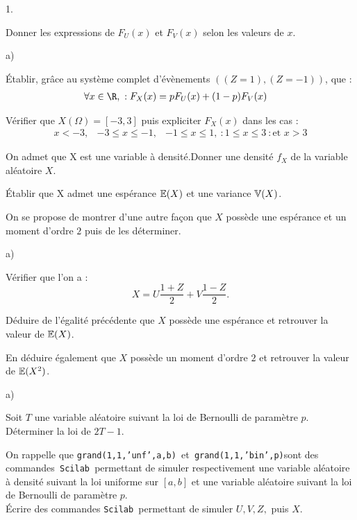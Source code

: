 \documentclass[11pt]{article}%
\begin{document}
\begin{noliste}{1.}
 \setlength{\itemsep}{4mm}
\item Donner les expressions de $F_{U}(x)$ et $F_{V}(x)$ selon les
valeurs
de $x$. 
\item 

\begin{noliste}{a)}
 \setlength{\itemsep}{2mm}
\item Établir, grâce au système complet d'évènements $\left((Z = 1),(Z
= -1)\right)$, que : 
\begin{align*}
\forall x\in\R,\ :F_{X}(x) & = pF_{U}(x) + (1-p)F_{V}(x)
\end{align*}

\item Vérifier que $X(\varOmega) = [-3,3]$ puis expliciter $F_{X}(x)$
dans
les cas : 
\begin{eqnarray*}
x<-3, & -3\leq x\leq-1, & -1\leq x\leq1,\ :1\leq x\leq3\ :\mbox{et }x>3
\end{eqnarray*}

\item On admet que X est une variable à densité.Donner une densité
$f_{X}$
de la variable aléatoire $X$. 
\item \noindent Établir que X admet une espérance $\mathbb{E}(X)$ et une
variance
$\mathbb{V}(X)$. 
\end{noliste}
\item On se propose de montrer d'une autre façon que $X$ possède une
espérance
et un moment d'ordre $2$ puis de les déterminer.

\begin{noliste}{a)}
 \setlength{\itemsep}{2mm}
\item Vérifier que l'on a : 
\[
X = U\frac{1 + Z}{2} + V\frac{1-Z}{2}.
\]

\item Déduire de l'égalité précédente que $X$ possède une espérance et
retrouver la valeur de $\mathbb{E}(X)$. 
\item En déduire également que $X$ possède un moment d'ordre $2$ et
retrouver
la valeur de $\mathbb{E}(X^{2})$. 
\end{noliste}
\item \noindent %

\begin{noliste}{a)}
 \setlength{\itemsep}{2mm}
\item Soit $T$ une variable aléatoire suivant la loi de Bernoulli de
paramètre
$p$. Déterminer la loi de $2T-1$. 
\item On rappelle que \texttt{grand(1,1,'unf',a,b) }et\texttt{
grand(1,1,'bin',p)}sont
des commandes\texttt{ Scilab }permettant de simuler respectivement
une variable aléatoire à densité suivant la loi uniforme sur $[a,b]$
et une variable aléatoire suivant la loi de Bernoulli de paramètre
$p$.\\
 Écrire des commandes \texttt{Scilab }permettant de simuler $U,V,Z,$
puis $X$. 
\end{noliste}
\end{noliste}
\end{document}
